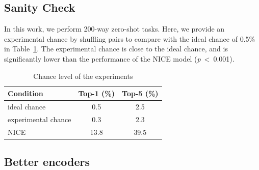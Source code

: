 \subsection{Sanity Check}
In this work, we perform 200-way zero-shot tasks.
Here, we provide an experimental chance by shuffling pairs to compare with the ideal chance of 0.5\% in Table~\ref{tab:4}.
The experimental chance is close to the ideal chance, and is significantly lower than the performance of the NICE model (\textit{p}\ \textless\ 0.001). 
\label{sec:appendA0}
\begin{table}[ht]
  \caption{Chance level of the experiments}
  \label{tab:4}
  \small
  \centering
\begin{tabular}{lcc}
   \toprule
   Condition & Top-1 (\%) & Top-5 (\%) \\
   \midrule
   ideal chance & 0.5 & 2.5 \\
   experimental chance & 0.3 & 2.3 \\
   NICE & 13.8 & 39.5 \\
   \bottomrule
\end{tabular}
\end{table}

\subsection{Better encoders}
\label{sec:appendA1}

